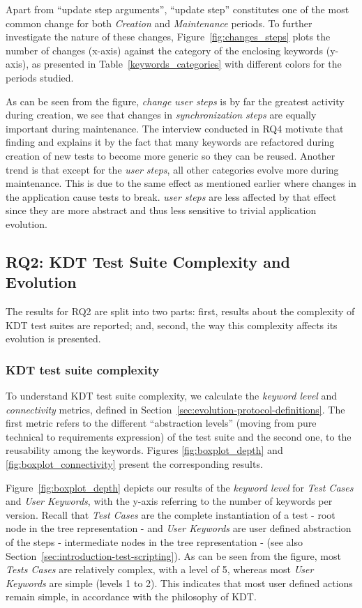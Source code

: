 Apart from ``update step arguments'', ``update step'' constitutes one of the most common change for both \emph{Creation} and \emph{Maintenance} periods. To further investigate the nature of these changes, Figure~\ref{fig:changes_steps} plots the number of changes (x-axis) against the category of the enclosing keywords (y-axis), as presented in Table~\ref{keywords_categories} with different colors for the periods studied.

As can be seen from the figure, \emph{change user steps} is by far the greatest activity during creation, we see that changes in \emph{synchronization steps} are equally important during maintenance. The interview conducted in RQ4 motivate that finding and explains it by the fact that many keywords are refactored during creation of new tests to become more generic so they can be reused. Another trend is that except for the \emph{user steps}, all other categories evolve more during maintenance. This is due to the same effect as mentioned earlier where changes in the application cause tests to break. \emph{user steps} are less affected by that effect since they are more abstract and thus less sensitive to trivial application evolution.

\subsection{RQ2: KDT Test Suite Complexity and Evolution}
\label{sec:evolution-results-rq2}

The results for RQ2 are split into two parts: first, results about the complexity of KDT test suites are reported; and, second, the way this complexity affects its evolution is presented.

\subsubsection{KDT test suite complexity}
\label{sec:kdt-test-suite}

To understand KDT test suite complexity, we calculate the \emph{keyword level} and \emph{connectivity} metrics, defined in Section~\ref{sec:evolution-protocol-definitions}. The first metric refers to the different ``abstraction levels'' (moving from pure technical to requirements expression) of the test suite and the second one, to the reusability among the keywords. Figures \ref{fig:boxplot_depth} and \ref{fig:boxplot_connectivity} present the corresponding results.

Figure~\ref{fig:boxplot_depth} depicts our results of the \emph{keyword level} for \emph{Test Cases} and \emph{User Keywords}, with the y-axis referring to the number of keywords per version. Recall that \emph{Test Cases} are the complete instantiation of a test - root node in the tree representation - and \emph{User Keywords} are user defined abstraction of the steps - intermediate nodes in the tree representation - (see also Section~\ref{sec:introduction-test-scripting}). As can be seen from the figure, most \emph{Tests Cases} are relatively complex, with a level of 5, whereas most \emph{User Keywords} are simple (levels 1 to 2). This indicates that most user defined actions remain simple, in accordance with the philosophy of KDT.

